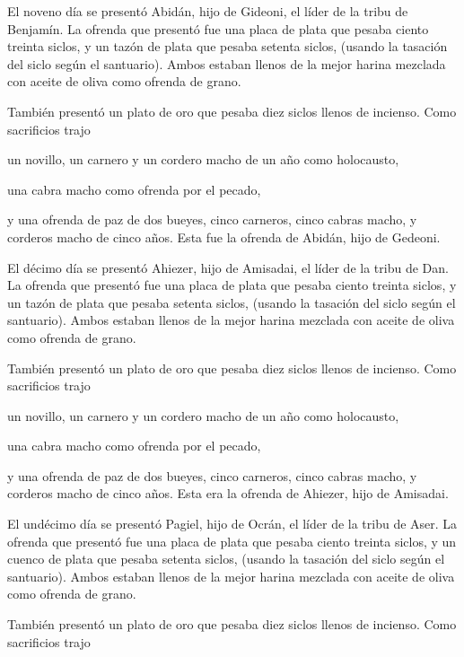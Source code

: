  El noveno día se presentó Abidán, hijo de Gideoni, el
líder de la tribu de Benjamín.  La ofrenda que presentó
fue una placa de plata que pesaba ciento treinta siclos, y un tazón de
plata que pesaba setenta siclos, (usando la tasación del siclo según el
santuario). Ambos estaban llenos de la mejor harina mezclada con aceite
de oliva como ofrenda de grano.

 También presentó un plato de oro que pesaba diez siclos
llenos de incienso. Como sacrificios trajo

 un novillo, un carnero y un cordero macho de un año como
holocausto,

 una cabra macho como ofrenda por el pecado,

 y una ofrenda de paz de dos bueyes, cinco carneros,
cinco cabras macho, y corderos macho de cinco años. Esta fue la ofrenda
de Abidán, hijo de Gedeoni.

 El décimo día se presentó Ahiezer, hijo de Amisadai, el
líder de la tribu de Dan.  La ofrenda que presentó fue
una placa de plata que pesaba ciento treinta siclos, y un tazón de plata
que pesaba setenta siclos, (usando la tasación del siclo según el
santuario). Ambos estaban llenos de la mejor harina mezclada con aceite
de oliva como ofrenda de grano.

 También presentó un plato de oro que pesaba diez siclos
llenos de incienso. Como sacrificios trajo

 un novillo, un carnero y un cordero macho de un año como
holocausto,

 una cabra macho como ofrenda por el pecado,

 y una ofrenda de paz de dos bueyes, cinco carneros,
cinco cabras macho, y corderos macho de cinco años. Esta era la ofrenda
de Ahiezer, hijo de Amisadai.

 El undécimo día se presentó Pagiel, hijo de Ocrán, el
líder de la tribu de Aser.  La ofrenda que presentó fue
una placa de plata que pesaba ciento treinta siclos, y un cuenco de
plata que pesaba setenta siclos, (usando la tasación del siclo según el
santuario). Ambos estaban llenos de la mejor harina mezclada con aceite
de oliva como ofrenda de grano.

 También presentó un plato de oro que pesaba diez siclos
llenos de incienso. Como sacrificios trajo

